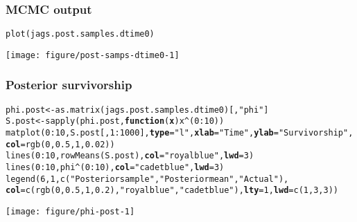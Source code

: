 \documentclass[color=usenames,dvipsnames]{beamer}\usepackage[]{graphicx}\usepackage[]{xcolor}
\makeatletter
\newcommand{\hlnum}[1]{\textcolor[rgb]{0.69,0.494,0}{#1}}%
\newcommand{\hlsng}[1]{\textcolor[rgb]{0.749,0.012,0.012}{#1}}%
\newcommand{\hlopt}[1]{\textcolor[rgb]{0,0,0}{#1}}%
\newcommand{\hldef}[1]{\textcolor[rgb]{0,0,0}{#1}}%
\newcommand{\hlkwa}[1]{\textcolor[rgb]{0,0,0}{\textbf{#1}}}%
\newcommand{\hlkwb}[1]{\textcolor[rgb]{0,0.341,0.682}{#1}}%
\newcommand{\hlkwc}[1]{\textcolor[rgb]{0,0,0}{\textbf{#1}}}%
\newcommand{\hlkwd}[1]{\textcolor[rgb]{0.004,0.004,0.506}{#1}}%
\newenvironment{kframe}{%
 \def\at@end@of@kframe{}%
 \ifinner\ifhmode%
  \def\at@end@of@kframe{\end{minipage}}%
  \begin{minipage}{\columnwidth}%
 \fi\fi%
 \def\FrameCommand##1{\hskip\@totalleftmargin \hskip-\fboxsep
 \colorbox{shadecolor}{##1}\hskip-\fboxsep
     \hskip-\linewidth \hskip-\@totalleftmargin \hskip\columnwidth}%
 \MakeFramed {\advance\hsize-\width
   \@totalleftmargin\z@ \linewidth\hsize
   \@setminipage}}%
 {\par\unskip\endMakeFramed%
 \at@end@of@kframe}
\newenvironment{knitrout}{}{} %
\makeatother
\begin{document}
\begin{frame}[fragile]
  \frametitle{MCMC output}
\begin{knitrout}
\color{fgcolor}\begin{kframe}
\begin{alltt}
\hlkwd{plot}\hldef{(jags.post.samples.dtime0)}
\end{alltt}
\end{kframe}

{\centering \texttt{[image: figure/post-samps-dtime0-1]} 

}


\end{knitrout}
\end{frame}




\begin{frame}[fragile]
  \frametitle{Posterior survivorship}
\begin{knitrout}\tiny
{}\color{fgcolor}\begin{kframe}
\begin{alltt}
\hldef{phi.post} \hlkwb{<-} \hlkwd{as.matrix}\hldef{(jags.post.samples.dtime0)[,}\hlsng{"phi"}\hldef{]}
\hldef{S.post} \hlkwb{<-} \hlkwd{sapply}\hldef{(phi.post,} \hlkwa{function}\hldef{(}\hlkwc{x}\hldef{) x}\hlopt{^}\hldef{(}\hlnum{0}\hlopt{:}\hlnum{10}\hldef{))}
\hlkwd{matplot}\hldef{(}\hlnum{0}\hlopt{:}\hlnum{10}\hldef{, S.post[,}\hlnum{1}\hlopt{:}\hlnum{1000}\hldef{],} \hlkwc{type}\hldef{=}\hlsng{"l"}\hldef{,} \hlkwc{xlab}\hldef{=}\hlsng{"Time"}\hldef{,} \hlkwc{ylab}\hldef{=}\hlsng{"Survivorship"}\hldef{,}
        \hlkwc{col}\hldef{=}\hlkwd{rgb}\hldef{(}\hlnum{0}\hldef{,}\hlnum{0.5}\hldef{,}\hlnum{1}\hldef{,}\hlnum{0.02}\hldef{))}
\hlkwd{lines}\hldef{(}\hlnum{0}\hlopt{:}\hlnum{10}\hldef{,} \hlkwd{rowMeans}\hldef{(S.post),} \hlkwc{col}\hldef{=}\hlsng{"royalblue"}\hldef{,} \hlkwc{lwd}\hldef{=}\hlnum{3}\hldef{)}
\hlkwd{lines}\hldef{(}\hlnum{0}\hlopt{:}\hlnum{10}\hldef{, phi}\hlopt{^}\hldef{(}\hlnum{0}\hlopt{:}\hlnum{10}\hldef{),} \hlkwc{col}\hldef{=}\hlsng{"cadetblue"}\hldef{,} \hlkwc{lwd}\hldef{=}\hlnum{3}\hldef{)}
\hlkwd{legend}\hldef{(}\hlnum{6}\hldef{,} \hlnum{1}\hldef{,} \hlkwd{c}\hldef{(}\hlsng{"Posterior sample"}\hldef{,} \hlsng{"Posterior mean"}\hldef{,} \hlsng{"Actual"}\hldef{),}
       \hlkwc{col}\hldef{=}\hlkwd{c}\hldef{(}\hlkwd{rgb}\hldef{(}\hlnum{0}\hldef{,}\hlnum{0.5}\hldef{,}\hlnum{1}\hldef{,}\hlnum{0.2}\hldef{),} \hlsng{"royalblue"}\hldef{,} \hlsng{"cadetblue"}\hldef{),} \hlkwc{lty}\hldef{=}\hlnum{1}\hldef{,} \hlkwc{lwd}\hldef{=}\hlkwd{c}\hldef{(}\hlnum{1}\hldef{,}\hlnum{3}\hldef{,}\hlnum{3}\hldef{))}
\end{alltt}
\end{kframe}

{\centering \texttt{[image: figure/phi-post-1]} 

}


\end{knitrout}
\end{frame}
\end{document}
